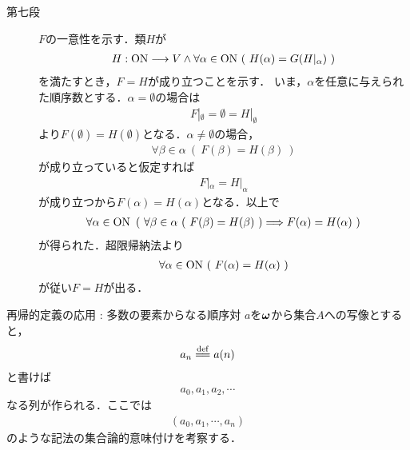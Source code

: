 \begin{prf}
\begin{description}
			\item[第七段]
				$F$の一意性を示す．類$H$が
				\begin{align}
					H:\mathrm{ON} \longrightarrow V 
					\wedge \forall \alpha \in \mathrm{ON}\ (\ H(\alpha) = G(H|_\alpha)\ )
				\end{align}
				を満たすとき，$F = H$が成り立つことを示す．
				いま，$\alpha$を任意に与えられた順序数とする．$\alpha = \emptyset$の場合は
				\begin{align}
					F|_\emptyset = \emptyset = H|_\emptyset
				\end{align}
				より$F(\emptyset) = H(\emptyset)$となる．$\alpha \neq \emptyset$の場合，
				\begin{align}
					\forall \beta \in \alpha\ (\ F(\beta) = H(\beta)\ )
				\end{align}
				が成り立っていると仮定すれば
				\begin{align}
					F|_\alpha = H|_\alpha
				\end{align}
				が成り立つから$F(\alpha) = H(\alpha)$となる．以上で
				\begin{align}
					\forall \alpha \in \ON\ \left(\ \forall \beta \in \alpha\ 
					(\ F(\beta) = H(\beta)\ ) \Longrightarrow F(\alpha) = H(\alpha)\ \right)
				\end{align}
				が得られた．超限帰納法より
				\begin{align}
					\forall \alpha \in \mathrm{ON}\ (\ F(\alpha) = H(\alpha)\ )
				\end{align}
				が従い$F = H$が出る．
				\QED
		\end{description}
	\end{prf}
	
	\begin{itembox}[l]{再帰的定義の応用 : 多数の要素からなる順序対}
		$a$を${\boldsymbol \omega}$から集合$A$への写像とすると，
		\begin{align}
			a_n \defeq a(n)
		\end{align}
		と書けば
		\begin{align}
			a_0, a_1, a_2, \cdots
		\end{align}
		なる列が作られる．ここでは
		\begin{align}
			(a_0,a_1,\cdots, a_n)
		\end{align}
		のような記法の集合論的意味付けを考察する．
	\end{itembox}
	
